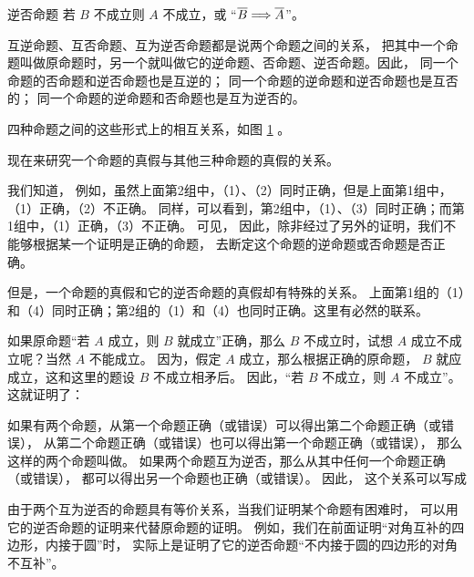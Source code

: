 逆否命题 \quad 若 $B$ 不成立则 $A$ 不成立，或 “$\overline{B} \Longrightarrow \overline{A}$”。

互逆命题、互否命题、互为逆否命题都是说两个命题之间的关系，
把其中一个命题叫做原命题时，另一个就叫做它的逆命题、否命题、逆否命题。因此，
同一个命题的否命题和逆否命题也是互逆的；
同一个命题的逆命题和逆否命题也是互否的；
同一个命题的逆命题和否命题也是互为逆否的。

四种命题之间的这些形式上的相互关系，如图 \ref{fig:czjh2-7-80} 。

\begin{figure}[htbp]
    \centering
    
    \caption{}\label{fig:czjh2-7-80}
\end{figure}


现在来研究一个命题的真假与其他三种命题的真假的关系。

我们知道，
例如，虽然上面第2组中，（1）、（2）同时正确，但是上面第1组中，（1）正确，（2）不正确。
同样，可以看到，第2组中，（1）、（3）同时正确；而第1组中，（1）正确，（3）不正确。
可见，
因此，除非经过了另外的证明，我们不能够根据某一个证明是正确的命题，
去断定这个命题的逆命题或否命题是否正确。

但是，一个命题的真假和它的逆否命题的真假却有特殊的关系。
上面第1组的（1）和（4）同时正确；第2组的（1）和（4）也同时正确。这里有必然的联系。

如果原命题“若 $A$ 成立，则 $B$ 就成立”正确，那么 $B$ 不成立时，试想 $A$ 成立不成立呢？当然 $A$ 不能成立。
因为，假定 $A$ 成立，那么根据正确的原命题， $B$ 就应成立，这和这里的题设 $B$ 不成立相矛后。
因此，“若 $B$ 不成立，则 $A$ 不成立”。这就证明了：


如果有两个命题，从第一个命题正确（或错误）可以得出第二个命题正确（或错误），
从第二个命题正确（或错误）也可以得出第一个命题正确（或错误），
那么这样的两个命题叫做。
如果两个命题互为逆否，那么从其中任何一个命题正确（或错误），
都可以得出另一个命题也正确（或错误）。
因此，
这个关系可以写成

由于两个互为逆否的命题具有等价关系，当我们证明某个命题有困难时，
可以用它的逆否命题的证明来代替原命题的证明。
例如，我们在前面证明“对角互补的四边形，内接于圆”时，
实际上是证明了它的逆否命题“不内接于圆的四边形的对角不互补”。




